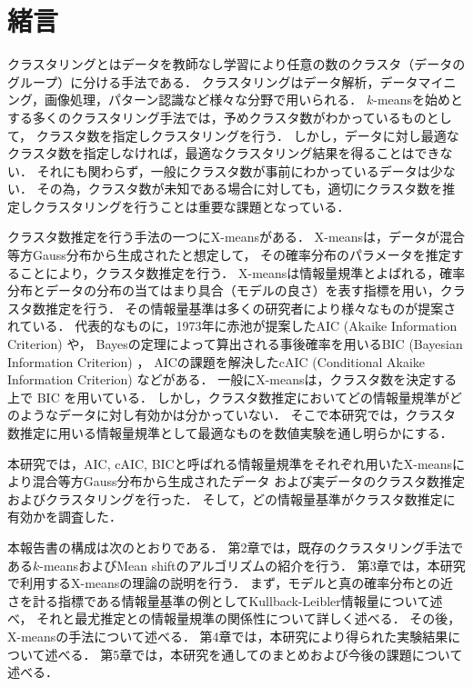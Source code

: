 \section{緒言}
クラスタリングとはデータを教師なし学習により任意の数のクラスタ（データのグループ）に分ける手法である．
クラスタリングはデータ解析，データマイニング，画像処理，パターン認識など様々な分野で用いられる．
$k$-meansを始めとする多くのクラスタリング手法では，予めクラスタ数がわかっているものとして，
クラスタ数を指定しクラスタリングを行う．
しかし，データに対し最適なクラスタ数を指定しなければ，最適なクラスタリング結果を得ることはできない．
それにも関わらず，一般にクラスタ数が事前にわかっているデータは少ない．
その為，クラスタ数が未知である場合に対しても，適切にクラスタ数を推定しクラスタリングを行うことは重要な課題となっている．

クラスタ数推定を行う手法の一つにX-meansがある．
X-meansは，データが混合等方Gauss分布から生成されたと想定して，
その確率分布のパラメータを推定することにより，クラスタ数推定を行う．
X-meansは情報量規準とよばれる，確率分布とデータの分布の当てはまり具合（モデルの良さ）を表す指標を用い，クラスタ数推定を行う．
その情報量基準は多くの研究者により様々なものが提案されている．
代表的なものに，1973年に赤池が提案したAIC (Akaike Information Criterion) や，
Bayesの定理によって算出される事後確率を用いるBIC (Bayesian Information Criterion) ，
AICの課題を解決したcAIC (Conditional Akaike Information Criterion) などがある．
一般にX-meansは，クラスタ数を決定する上で BIC を用いている．
しかし，クラスタ数推定においてどの情報量規準がどのようなデータに対し有効かは分かっていない．
そこで本研究では，クラスタ数推定に用いる情報量規準として最適なものを数値実験を通し明らかにする．

本研究では，AIC, cAIC, BICと呼ばれる情報量規準をそれぞれ用いたX-meansにより混合等方Gauss分布から生成されたデータ
および実データのクラスタ数推定およびクラスタリングを行った．
そして，どの情報量基準がクラスタ数推定に有効かを調査した．

本報告書の構成は次のとおりである．
第2章では，既存のクラスタリング手法である$k$-meansおよびMean shiftのアルゴリズムの紹介を行う．
第3章では，本研究で利用するX-meansの理論の説明を行う．
まず，モデルと真の確率分布との近さを計る指標である情報量基準の例としてKullback-Leibler情報量について述べ，
それと最尤推定との情報量規準の関係性について詳しく述べる．
その後，X-meansの手法について述べる．
第4章では，本研究により得られた実験結果について述べる．
第5章では，本研究を通してのまとめおよび今後の課題について述べる．

